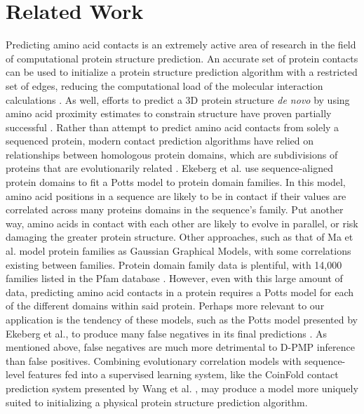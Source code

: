 \documentclass{article}
\begin{document}
\section{Related Work}
Predicting amino acid contacts is an extremely active area of research in the field of computational protein structure prediction. An accurate set of protein contacts can be used to initialize a protein structure prediction algorithm with a restricted set of edges, reducing the computational load of the molecular interaction calculations \cite{wuyun16}. As well, efforts to predict a 3D protein structure \emph{de novo} by using amino acid proximity estimates to constrain structure have proven partially successful \cite{colwell11}. Rather than attempt to predict amino acid contacts from solely a sequenced protein, modern contact prediction algorithms have relied on relationships between homologous protein domains, which are subdivisions of proteins that are evolutionarily related \cite {wuyun16} \cite{colwell11}\cite{ekeberg13}. Ekeberg et al. \cite{ekeberg13} use sequence-aligned protein domains to fit a Potts model to protein domain families. In this model, amino acid positions in a sequence are likely to be in contact if their values are correlated across many proteins domains in the sequence's family. Put another way, amino acids in contact with each other are likely to evolve in parallel, or risk damaging the greater protein structure. Other approaches, such as that of Ma et al. \cite{ma15} model protein families as Gaussian Graphical Models, with some correlations existing between families. Protein domain family data is plentiful, with 14,000 families listed in the Pfam database \cite{ekeberg13}. However, even with this large amount of data, predicting amino acid contacts in a protein requires a Potts model for each of the different domains within said protein. Perhaps more relevant to our application is the tendency of these models, such as the Potts model presented by Ekeberg et al., to produce many false negatives in its final predictions \cite{ekeberg13}. As mentioned above, false negatives are much more detrimental to D-PMP inference than false positives. Combining evolutionary correlation models with sequence-level features fed into a supervised learning system, like the CoinFold contact prediction system presented by Wang et al. \cite{wang16}, may produce a model more uniquely suited to initializing a physical protein structure prediction algorithm.
\end{document}
